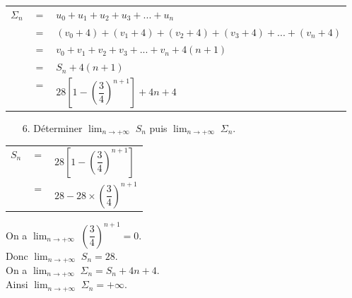 \begin{tabular}{lll}
$\Sigma_n$ & $=$ & $u_0 + u_1 + u_2 + u_3 + ... + u_n$ \\
& $=$ & $\left(v_0 + 4\right) + \left(v_1 + 4 \right) + \left(v_2 + 4\right) + \left(v_3 + 4\right) + ... + \left(v_n + 4\right)$ \\
& $=$ & $v_0 + v_1 + v_2 + v_3 + ... + v_n + 4\left(n+1\right)$ \\
& $=$ & $S_n + 4\left(n+1\right)$ \vspace*{.1cm} \\
& $=$ & $28\left[1 - \left(\dfrac{3}{4}\right)^{n+1} \right] + 4n + 4$ \vspace*{.3cm} \\
\end{tabular}

\vspace*{.3cm}

\begin{itemize}
\item[6.] Déterminer $ \displaystyle {\lim_{n \rightarrow +\infty}} \; S_n$ puis $ \displaystyle {\lim_{n \rightarrow +\infty}} \; \Sigma_n$. \\
\end{itemize}

\vspace*{.3cm}

\begin{tabular}{lll}
$S_n$ & $=$ & $28\left[1 - \left(\dfrac{3}{4}\right)^{n+1}\right]$ \vspace*{.1cm} \\
& $=$ & $28 - 28 \times \left(\dfrac{3}{4}\right)^{n+1}$ \\
\end{tabular}

\vspace*{.3cm}

On a $ \displaystyle {\lim_{n \rightarrow +\infty}} \; \left(\dfrac{3}{4}\right)^{n+1} = 0$. \\

Donc $ \displaystyle {\lim_{n \rightarrow +\infty}} \; S_n = 28$. \\

On a $ \displaystyle {\lim_{n \rightarrow +\infty}} \; \Sigma_n = S_n + 4n + 4$. \\

Ainsi $ \displaystyle {\lim_{n \rightarrow +\infty}} \; \Sigma_n = +\infty$. 

\vspace*{-5cm}

